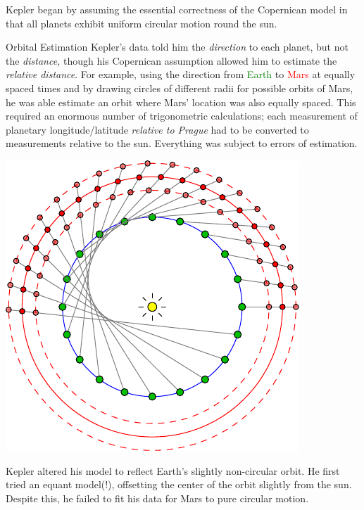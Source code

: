 \begin{description}
  \item[Starting point] Kepler began by assuming the essential correctness of the Copernican model in that all planets exhibit uniform circular motion round the sun.\par
\begin{minipage}[t]{0.65\linewidth}\vspace{-5pt}
  \item[Orbital Estimation] Kepler's data told him the \emph{direction} to each planet, but not the \emph{distance,} though his Copernican assumption allowed him to estimate the \emph{relative distance}.\footnotemark{} For example, using the direction from \textcolor{Green}{Earth} to \textcolor{red}{Mars} at equally spaced times and by drawing circles of different radii for possible orbits of Mars, he was able estimate an orbit where Mars' location was also equally spaced. This required an enormous number of trigonometric calculations; each measurement of planetary longitude/latitude \emph{relative to Prague} had to be converted to measurements relative to the sun. Everything was subject to errors of estimation.
\end{minipage}\hfill\begin{minipage}[t]{0.33\linewidth}\vspace{-6pt}
\flushright\includegraphics[scale=0.75]{ren-kepler3}
\end{minipage}\par

  \item[Modifying the model] Kepler altered his model to reflect Earth's slightly non-circular orbit. He first tried an equant model(!), offsetting the center of the orbit slightly from the sun. Despite this, he failed to fit his data for Mars to pure circular motion.
  

\end{description}

